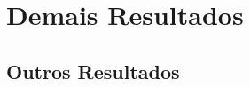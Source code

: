 

\chapter{\Large{Demais Resultados}}\label{chp:5}


\section{{Outros Resultados}}


\subsection{{}}









                       






 



 







